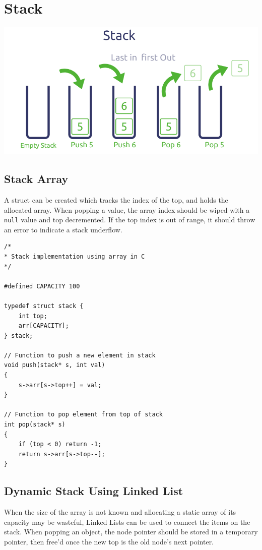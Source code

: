 \documentclass[11pt]{article}
\begin{document}
\section{Stack}
\begin{center}
    \includegraphics[width=250 px]{img/stack}  \\
\end{center}

\subsection{Stack Array}

A struct can be created which tracks the index of the top, and holds the allocated array. When popping a value, the array index should be wiped with a \texttt{null} value and top decremented. If the top index is out of range, it should throw an error to indicate a stack underflow.

\begin{lstlisting}
/*
* Stack implementation using array in C
*/

#defined CAPACITY 100

typedef struct stack {
    int top;
    arr[CAPACITY];
} stack;

// Function to push a new element in stack
void push(stack* s, int val)
{
    s->arr[s->top++] = val;
}

// Function to pop element from top of stack
int pop(stack* s)
{    
    if (top < 0) return -1;
    return s->arr[s->top--];
}
\end{lstlisting}

\subsection{Dynamic Stack Using Linked List}

When the size of the array is not known and allocating a static array of its capacity may be wasteful, Linked Lists can be used to connect the items on the stack. When popping an object, the node pointer should be stored in a temporary pointer, then free'd once the new top is the old node's next pointer.
\end{document}
